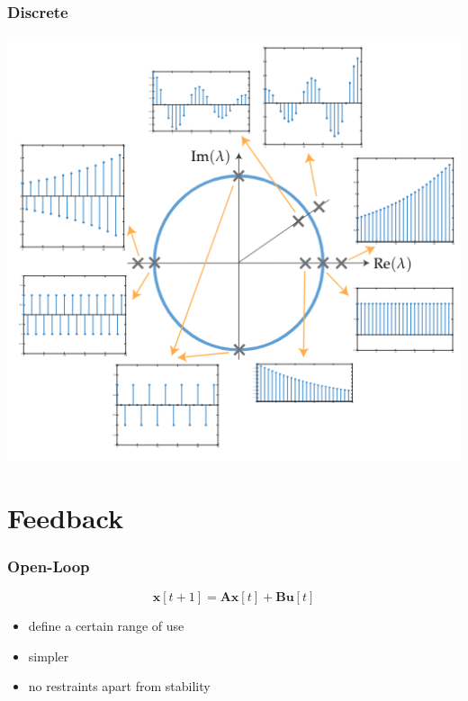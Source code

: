 \documentclass[aspectratio=169]{beamer}
\begin{document}
\begin{frame}
    \frametitle{Discrete}
    
    \centering
    \includegraphics[width=\textheight]{discrete.png}
\end{frame}

\section{Feedback}

\begin{frame}
    \frametitle{Open-Loop}

    \begin{equation}
        \bm{x}[t + 1] = \bm{Ax}[t] + \bm{Bu}[t]
    \end{equation}

    \begin{itemize}
        \item define a certain range of use
        \item simpler
        \item no restraints apart from stability
    \end{itemize}
\end{frame}
\end{document}
